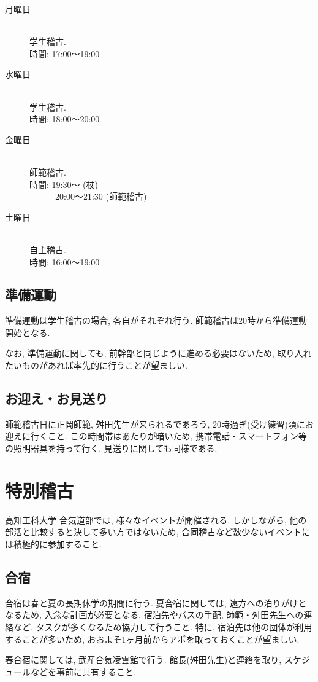 \documentclass[a4j,titlepage]{jarticle}
\begin{document}
\begin{description}
\item[月曜日]\mbox{} \\
  学生稽古. \\
  時間: 17:00〜19:00 \\
\item[水曜日]\mbox{} \\
  学生稽古. \\
  時間: 18:00〜20:00 \\
\item[金曜日]\mbox{} \\
  師範稽古. \\
  時間: 19:30〜 (杖) \\
  ~~~~~~20:00〜21:30 (師範稽古) \\
\item[土曜日]\mbox{} \\
  自主稽古. \\
  時間: 16:00〜19:00
\end{description}

\newpage

\subsection{準備運動}
準備運動は学生稽古の場合, 各自がそれぞれ行う. 師範稽古は20時から準備運動開始となる. \par
なお, 準備運動に関しても, 前幹部と同じように進める必要はないため, 取り入れたいものがあれば率先的に行うことが望ましい.

\subsection{お迎え・お見送り}
師範稽古日に正岡師範, 舛田先生が来られるであろう, 20時過ぎ(受け練習)頃にお迎えに行くこと. この時間帯はあたりが暗いため, 携帯電話・スマートフォン等の照明器具を持って行く. 見送りに関しても同様である.

\section{特別稽古}
高知工科大学 合気道部では, 様々なイベントが開催される. しかしながら, 他の部活と比較すると決して多い方ではないため, 合同稽古など数少ないイベントには積極的に参加すること.

\subsection{合宿}
合宿は春と夏の長期休学の期間に行う. 夏合宿に関しては, 遠方への泊りがけとなるため, 入念な計画が必要となる. 宿泊先やバスの手配, 師範・舛田先生への連絡など, タスクが多くなるため協力して行うこと. 特に, 宿泊先は他の団体が利用することが多いため, おおよそ1ヶ月前からアポを取っておくことが望ましい. \par
春合宿に関しては, 武産合気凌雲館で行う. 館長(舛田先生)と連絡を取り, スケジュールなどを事前に共有すること.
\end{document}
